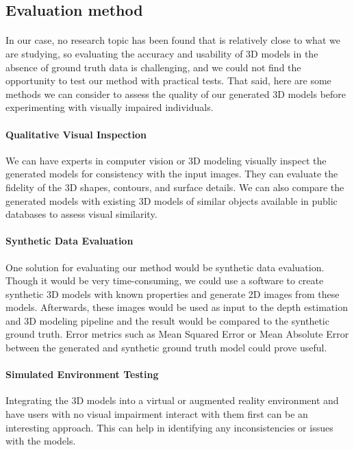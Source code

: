 \documentclass[12pt, letterpaper]{article}
\begin{document}
\begin{spacing}{1.15}
\subsection{Evaluation method}

\paragraph{}
In our case, no research topic has been found that is relatively close to what we are studying, so evaluating the accuracy and usability of 3D
models in the absence of ground truth data is challenging, and we could not find the opportunity to test our method with practical tests. That
said, here are some methods we can consider to assess the quality of our generated 3D models before experimenting with visually impaired
individuals.

\paragraph{Qualitative Visual Inspection} We can have experts in computer vision or 3D modeling visually inspect the generated models
for consistency with the input images. They can evaluate the fidelity of the 3D shapes, contours, and surface details. We can also compare the
generated models with existing 3D models of similar objects available in public databases to assess visual similarity.

\paragraph{Synthetic Data Evaluation} One solution for evaluating our method would be synthetic data evaluation. Though it would be very time-consuming, we could
use a software to create synthetic 3D models with known properties and generate 2D images from these models. Afterwards, these images would be used as input to
the depth estimation and 3D modeling pipeline and the result would be compared to the synthetic ground truth.
Error metrics such as Mean Squared Error or Mean Absolute Error between the generated and synthetic ground truth model could prove useful.

\paragraph{Simulated Environment Testing} Integrating the 3D models into a virtual or augmented reality environment and have users with no visual impairment 
interact with them first can be an interesting approach. This can help in identifying any inconsistencies or issues with the models.


\end{spacing}
\end{document}

